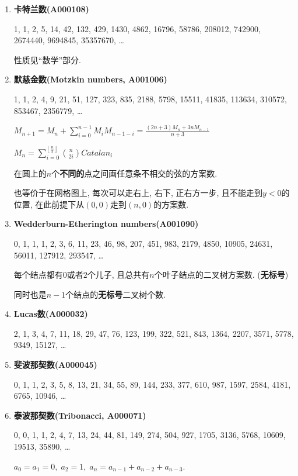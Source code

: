 \begin{enumerate}

\item \textbf{卡特兰数(A000108)}

1, 1, 2, 5, 14, 42, 132, 429, 1430, 4862, 16796, 58786, 208012, 742900, 2674440, 9694845, 35357670, \dots

性质见``数学''部分.

\item \textbf{默慈金数(Motzkin numbers, A001006)}

1, 1, 2, 4, 9, 21, 51, 127, 323, 835, 2188, 5798, 15511, 41835, 113634, 310572, 853467, 2356779, \dots

$ M_{n + 1} = M_n + \sum_{i = 0} ^ {n - 1} M_i M_{n - 1 - i} = \frac {(2n + 3)M_n + 3n M_{n - 1}} {n + 3} $

$ M_n = \sum_{i = 0} ^ {\left\lfloor \frac n 2 \right\rfloor} {n \choose 2i} Catalan_{i} $

在圆上的$n$个\textbf{不同的}点之间画任意条不相交的弦的方案数.

也等价于在网格图上, 每次可以走右上, 右下, 正右方一步, 且不能走到$y<0$的位置, 在此前提下从$(0, 0)$走到$(n, 0)$的方案数.


\item \textbf{Wedderburn-Etherington numbers(A001090)}

0, 1, 1, 1, 2, 3, 6, 11, 23, 46, 98, 207, 451, 983, 2179, 4850, 10905, 24631, 56011, 127912, 293547, \dots

每个结点都有$0$或者$2$个儿子, 且总共有$n$个叶子结点的二叉树方案数. (\textbf{无标号})

同时也是$n-1$个结点的\textbf{无标号}二叉树个数.

\item \textbf{Lucas数(A000032)}

2, 1, 3, 4, 7, 11, 18, 29, 47, 76, 123, 199, 322, 521, 843, 1364, 2207, 3571, 5778, 9349, 15127, \dots

\item \textbf{斐波那契数(A000045)}

0, 1, 1, 2, 3, 5, 8, 13, 21, 34, 55, 89, 144, 233, 377, 610, 987, 1597, 2584, 4181, 6765, 10946, \dots

\item \textbf{泰波那契数(Tribonacci, A000071)}

0, 0, 1, 1, 2, 4, 7, 13, 24, 44, 81, 149, 274, 504, 927, 1705, 3136, 5768, 10609, 19513, 35890, \dots

$ a_0 = a_1 = 0,\; a_2 = 1,\; a_n = a_{n - 1} + a_{n - 2} + a_{n - 3} $.


\end{enumerate}
